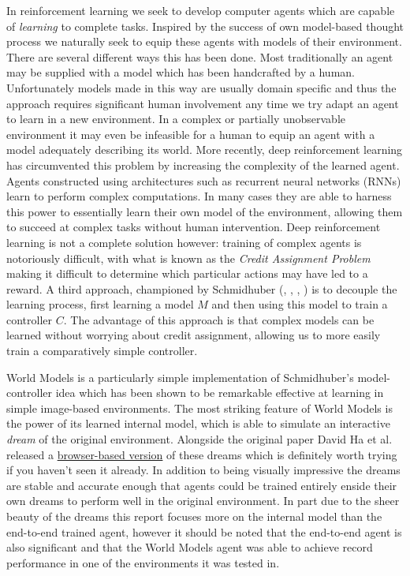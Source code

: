 \documentclass{article}
\numberwithin{figure}{section}
\theoremstyle{definition}
\begin{document}
In reinforcement learning we seek to develop computer agents which are capable of \textit{learning} to complete tasks.
Inspired by the success of own model-based thought process we naturally seek to equip these agents with models of their environment.
There are several different ways this has been done.
Most traditionally an agent may be supplied with a model which has been handcrafted by a human. %
Unfortunately models made in this way are usually domain specific and thus the approach requires significant human involvement any time we try adapt an agent to learn in a new environment.
In a complex or partially unobservable environment it may even be infeasible for a human to equip an agent with a model adequately describing its world. %
More recently, deep reinforcement learning has circumvented this problem by increasing the complexity of the learned agent.
Agents constructed using architectures such as recurrent neural networks (RNNs) learn to perform complex computations.
In many cases they are able to harness this power to essentially learn their own model of the environment, allowing them to succeed at complex tasks without human intervention.
Deep reinforcement learning is not a complete solution however: training of complex agents is notoriously difficult, with what is known as the \textit{Credit Assignment Problem} \citep{minsky1961steps} making it difficult to determine which particular actions may have led to a reward.
A third approach, championed by Schmidhuber (\citeyear{schmidhuber1990making}, \citeyear{schmidhuber1990line} \citeyear{schmidhuber1991possibility}, \citeyear{schmidhuber1991reinforcement}, \citeyear{schmidhuber2015learning}) is to decouple the learning process, first learning a model $M$ and then using this model to train a controller $C$.
The advantage of this approach is that complex models can be learned without worrying about credit assignment, allowing us to more easily train a comparatively simple controller.

World Models \citep{ha2018world} is a particularly simple implementation of Schmidhuber's model-controller idea which has been shown to be remarkable effective at learning in simple image-based environments.
The most striking feature of World Models is the power of its learned internal model, which is able to simulate an interactive \textit{dream} of the original environment.
Alongside the original paper David Ha et al. released a \href{https://worldmodels.github.io/}{browser-based version} of these dreams which is definitely worth trying if you haven't seen it already.
In addition to being visually impressive the dreams are stable and accurate enough that agents could be trained entirely enside their own dreams to perform well in the original environment.
In part due to the sheer beauty of the dreams this report focuses more on the internal model than the end-to-end trained agent, however it should be noted that the end-to-end agent is also significant and that the World Models agent was able to achieve record performance in one of the environments it was tested in.
\end{document}
